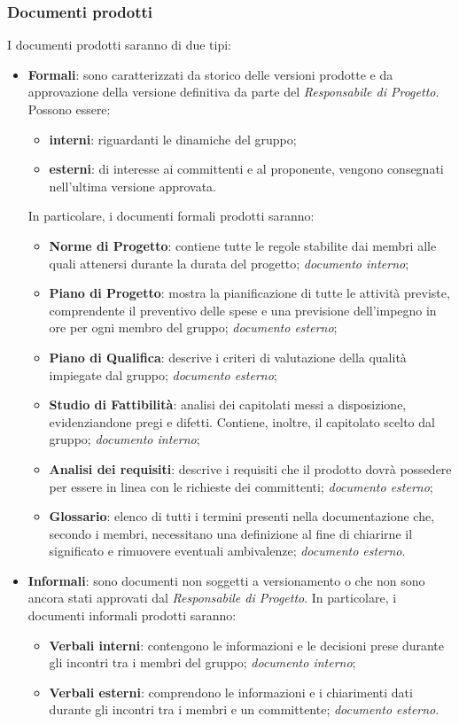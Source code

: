 \subsubsection{Documenti prodotti}
I documenti prodotti saranno di due tipi:
\begin{itemize}
	\item \textbf{Formali}: sono caratterizzati da storico delle versioni prodotte e da approvazione della versione definitiva da parte del \textit{Responsabile di Progetto}. Possono essere:
	\begin{itemize}
		\item \textbf{interni}: riguardanti le dinamiche del gruppo;
		\item \textbf{esterni}: di interesse ai committenti e al proponente, vengono consegnati nell'ultima versione approvata.
	\end{itemize} 
In particolare, i documenti formali prodotti saranno:
	\begin{itemize}
		\item \textbf{Norme di Progetto}: contiene tutte le regole stabilite dai membri alle quali attenersi durante la durata del progetto; \textit{documento interno};
	\item \textbf{Piano di Progetto}: mostra la pianificazione di tutte le attività previste, comprendente il preventivo delle spese e una previsione dell'impegno in ore per ogni membro del gruppo; \textit{documento esterno};
	\item \textbf{Piano di Qualifica}: descrive i criteri di valutazione della qualità impiegate dal gruppo; \textit{documento esterno};
	\item \textbf{Studio di Fattibilità}: analisi dei capitolati messi a disposizione, evidenziandone pregi e difetti. Contiene,  inoltre,  il capitolato scelto dal gruppo; \textit{documento interno};
	\item \textbf{Analisi dei requisiti}: descrive i requisiti che il prodotto dovrà possedere per essere in linea con le richieste dei committenti; \textit{documento esterno};
	\item \textbf{Glossario}: elenco di tutti i termini presenti nella documentazione che, secondo i membri, necessitano una definizione al fine di chiarirne il significato e rimuovere eventuali ambivalenze; \textit{documento esterno}.
	\end{itemize}
\item \textbf{Informali}: sono documenti non soggetti a versionamento o che non sono ancora stati approvati dal \textit{Responsabile di Progetto}. \newline 
In particolare, i documenti informali prodotti saranno:
	\begin{itemize}	
		\item \textbf{Verbali interni}: contengono le informazioni e le decisioni prese durante gli incontri tra i membri del gruppo; \textit{documento interno};
		\item \textbf{Verbali esterni}: comprendono le informazioni e i chiarimenti dati durante gli incontri tra i membri e un committente; \textit{documento esterno}.
	\end{itemize}
\end{itemize}
